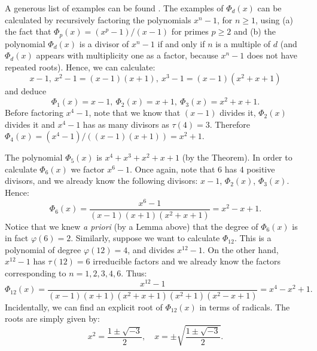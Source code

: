 \documentclass[12pt]{article}
\theoremstyle{definition}
\begin{document}
A generous list of examples can be found . The examples of $\Phi_d(x)$ can be calculated by recursively factoring the polynomials $x^n-1$, for $n\geq 1$, using (a) the fact that $\Phi_p(x)=(x^p-1)/(x-1)$ for primes $p\geq 2$ and (b) the polynomial $\Phi_d(x)$ is a divisor of $x^n-1$ if and only if $n$ is a multiple of $d$ (and $\Phi_d(x)$ appears with multiplicity one as a factor, because $x^n-1$ does not have repeated roots). Hence, we can calculate:
$$x-1,\ x^2-1=(x-1)(x+1),\ x^3-1=(x-1)(x^2+x+1)$$
and deduce 
$$\Phi_1(x)=x-1,\ \Phi_2(x)=x+1,\  \Phi_3(x)=x^2+x+1.$$ 
Before factoring $x^4-1$, note that we know that $(x-1)$ divides it, $\Phi_2(x)$ divides it and $x^4-1$ has as many divisors as $\tau(4)=3$. Therefore $\Phi_4(x)=(x^4-1)/((x-1)(x+1))=x^2+1$.

The polynomial $\Phi_5(x)$ is $x^4+x^3+x^2+x+1$ (by the Theorem). In order to calculate $\Phi_6(x)$ we factor $x^6-1$. Once again, note that $6$ has $4$ positive divisors, and we already know the following divisors: $x-1$, $\Phi_2(x)$, $\Phi_3(x)$. Hence:
$$\Phi_6(x)=\frac{x^6-1}{(x-1)(x+1)(x^2+x+1)}=x^2-x+1.$$
Notice that we knew {\it a priori} (by a Lemma above) that the degree of $\Phi_6(x)$ is in fact $\varphi(6)=2$. Similarly, suppose we want to calculate $\Phi_{12}$. This is a polynomial of degree $\varphi(12)=4$, and divides $x^{12}-1$. On the other hand, $x^{12}-1$ has $\tau(12)=6$ irreducible factors and we already know the factors corresponding to $n=1,2,3,4,6$. Thus:
$$\Phi_{12}(x)=\frac{x^{12}-1}{(x-1)(x+1)(x^2+x+1)(x^2+1)(x^2-x+1)}=x^4-x^2+1.$$
Incidentally, we can find an explicit root of $\Phi_{12}(x)$ in terms of radicals. The roots are simply given by:
$$x^2=\frac{1\pm\sqrt{-3}}{2}, \quad x=\pm \sqrt{\frac{1\pm\sqrt{-3}}{2}}.$$
\end{document}
